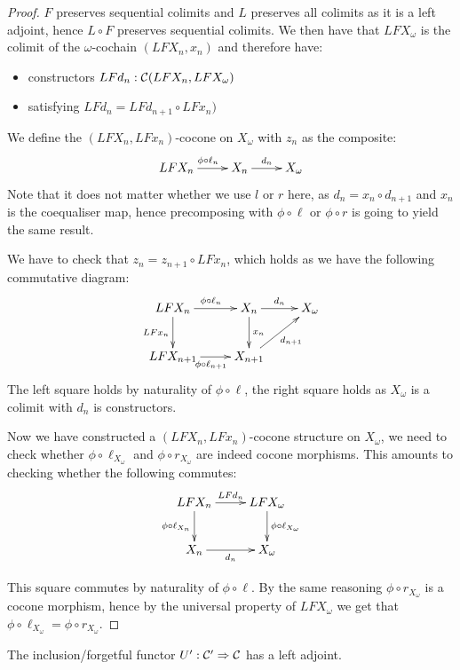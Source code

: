 \begin{proof}
  $F$ preserves sequential colimits and $L$ preserves all colimits as
  it is a left adjoint, hence $L \circ F$ preserves sequential
  colimits. We then have that $LFX_\omega$ is the colimit of the
  $\omega$-cochain $(LFX_n,x_n)$ and therefore have:
  \begin{itemize}
  \item constructors $LFd_n : \mathcal{C}(LFX_n, LFX_\omega)$
  \item satisfying $LFd_n = LFd_{n+1} \circ LFx_n)$
  \end{itemize}

  We define the $(LFX_n,LFx_n)$-cocone on $X_\omega$ with $z_n$ as the
  composite:
  $$
  \xymatrix{
    LFX_n
    \ar[r]^{\phi \circ \ell_n}
    &X_n
    \ar[r]^{d_n}
    &X_\omega
  }
  $$
  Note that it does not matter whether we use $l$ or $r$ here, as
  $d_n = x_n \circ d_{n+1}$ and $x_n$ is the coequaliser map, hence
  precomposing with $\phi \circ \ell$ or $\phi \circ r$ is going to yield
  the same result.

  We have to check that $z_n = z_{n+1} \circ LFx_n$, which holds as we
  have the following commutative diagram:
  $$
  \xymatrix{
    LFX_n
    \ar[r]^{\phi \circ \ell_n}
    \ar[d]_{LF x_n}
    &X_n
    \ar[r]^{d_n}
    \ar[d]^{x_n}
    &X_\omega
    \\
    LFX_{n+1}
    \ar[r]_{\phi \circ \ell_{n+1}}
    &X_{n+1}
    \ar[ur]_{d_{n+1}}
  }
  $$
  The left square holds by naturality of $\phi \circ \ell$, the right
  square holds as $X_\omega$ is a colimit with $d_n$ is constructors.
  
  Now we have constructed a $(LFX_n,LFx_n)$-cocone structure on
  $X_\omega$, we need to check whether $\phi \circ \ell_{X_\omega}$ and
  $\phi \circ r_{X_\omega}$ are indeed cocone morphisms. This amounts
  to checking whether the following commutes:
  $$
  \xymatrix{
    LFX_n
    \ar[r]^{LF d_n}
    \ar[d]_{\phi \circ \ell_{X_n}}
    &LFX_\omega
    \ar[d]^{\phi \circ \ell_{X_\omega}}
    \\
    X_n
    \ar[r]_{d_n}
    &X_\omega
  }
  $$

  This square commutes by naturality of $\phi \circ \ell$. By the same
  reasoning $\phi \circ r_{X_\omega}$ is a cocone morphism, hence by
  the universal property of $LFX_\omega$ we get that
  $\phi \circ \ell_{X_\omega} = \phi \circ r_{X_\omega}$.
\end{proof}

\begin{proposition}
  The inclusion/forgetful functor $U' : \mathcal{C}' \Rightarrow \mathcal{C}$ has a left
  adjoint.
\end{proposition}

